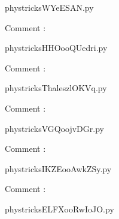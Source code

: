     \newcommand{\CaptionFigWYeESAN}{<+Type your caption here+>}
    \begin{center}
        
    \end{center}
    phystricksWYeESAN.py

    Comment : 

    \clearpage
    


    \newcommand{\CaptionFigHHOooQUedri}{<+Type your caption here+>}
    \begin{center}
        
    \end{center}
    phystricksHHOooQUedri.py

    Comment : 

    \clearpage
    


    \newcommand{\CaptionFigThaleszlOKVq}{<+Type your caption here+>}
    \begin{center}
        
    \end{center}
    phystricksThaleszlOKVq.py

    Comment : 

    \clearpage
    


    \newcommand{\CaptionFigVGQoojvDGr}{<+Type your caption here+>}
    \begin{center}
        
    \end{center}
    phystricksVGQoojvDGr.py

    Comment : 

    \clearpage
    


    \newcommand{\CaptionFigIKZEooAwkZSy}{<+Type your caption here+>}
    \begin{center}
        
    \end{center}
    phystricksIKZEooAwkZSy.py

    Comment : 

    \clearpage
    


    \newcommand{\CaptionFigELFXooRwIoJO}{<+Type your caption here+>}
    \begin{center}
        
    \end{center}
    phystricksELFXooRwIoJO.py

